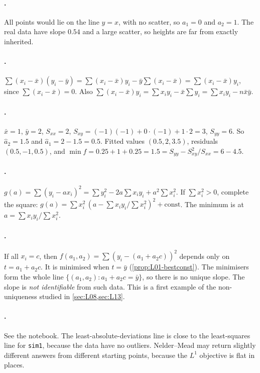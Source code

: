 \paragraph{.}
All points would lie on the line $y=x$, with no scatter, so $a_1=0$ and $a_2=1$. The real data
have slope $0.54$ and a large scatter, so heights are far from exactly inherited.

\paragraph{.}
$\sum(x_i-\bar x)(y_i-\bar y)=\sum(x_i-\bar x)y_i-\bar y\sum(x_i-\bar x)=\sum(x_i-\bar x)y_i$,
since $\sum(x_i-\bar x)=0$. Also $\sum(x_i-\bar x)y_i=\sum x_iy_i-\bar x\sum y_i=\sum x_iy_i-n\bar x\bar y$.

\paragraph{.}
$\bar x=1$, $\bar y=2$, $S_{xx}=2$, $S_{xy}=(-1)(-1)+0\cdot(-1)+1\cdot 2=3$, $S_{yy}=6$.
So $\hat a_2=1.5$ and $\hat a_1=2-1.5=0.5$. Fitted values $(0.5,2,3.5)$, residuals $(0.5,-1,0.5)$,
and $\min f=0.25+1+0.25=1.5=S_{yy}-S_{xy}^2/S_{xx}=6-4.5$.

\paragraph{.}
$g(a)=\sum(y_i-ax_i)^2=\sum y_i^2-2a\sum x_iy_i+a^2\sum x_i^2$. If $\sum x_i^2>0$, complete the square:
$g(a)=\sum x_i^2\,(a-\sum x_iy_i/\sum x_i^2)^2+\text{const}$. The minimum is at $a=\sum x_iy_i/\sum x_i^2$.

\paragraph{.}
If all $x_i=c$, then $f(a_1,a_2)=\sum(y_i-(a_1+a_2c))^2$ depends only on $t=a_1+a_2c$. It is
minimised when $t=\bar y$ (\cref{prop:L01-bestconst}). The minimisers form the whole line
$\{(a_1,a_2):a_1+a_2c=\bar y\}$, so there is no unique slope. The slope is \emph{not
identifiable} from such data. This is a first example of the non-uniqueness studied in
\cref{sec:L08,sec:L13}.

\paragraph{.}
See the notebook. The least-absolute-deviations line is close to the least-squares line for
\texttt{sim1}, because the data have no outliers. Nelder--Mead may return slightly different
answers from different starting points, because the $L^1$ objective is flat in places.

